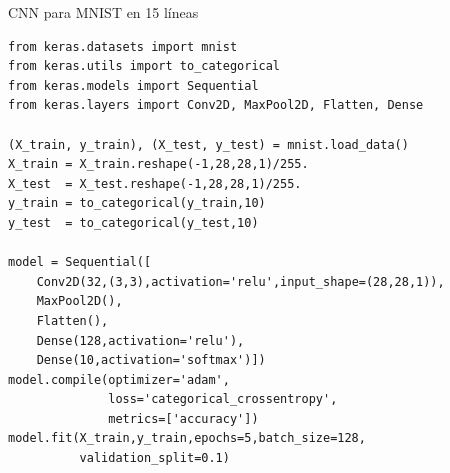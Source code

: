 \documentclass[8pt,spanish]{beamer}
\begin{document}
\begin{frame}[fragile]{CNN para MNIST en 15 líneas}
  \begin{verbatim}
from keras.datasets import mnist
from keras.utils import to_categorical
from keras.models import Sequential
from keras.layers import Conv2D, MaxPool2D, Flatten, Dense

(X_train, y_train), (X_test, y_test) = mnist.load_data()
X_train = X_train.reshape(-1,28,28,1)/255.
X_test  = X_test.reshape(-1,28,28,1)/255.
y_train = to_categorical(y_train,10)
y_test  = to_categorical(y_test,10)

model = Sequential([
    Conv2D(32,(3,3),activation='relu',input_shape=(28,28,1)),
    MaxPool2D(),
    Flatten(),
    Dense(128,activation='relu'),
    Dense(10,activation='softmax')])
model.compile(optimizer='adam',
              loss='categorical_crossentropy',
              metrics=['accuracy'])
model.fit(X_train,y_train,epochs=5,batch_size=128,
          validation_split=0.1)
  \end{verbatim}
\end{frame}
\end{document}
